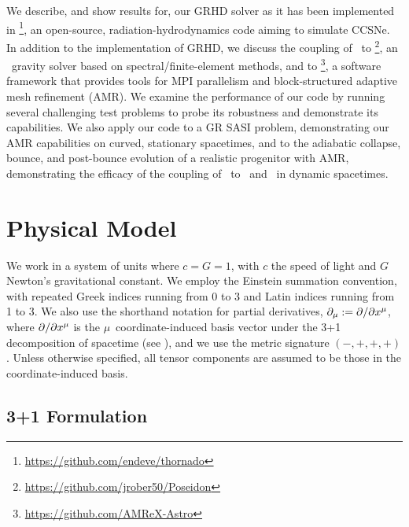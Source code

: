 We describe, and show results for, our GRHD solver
as it has been implemented in \thornado%
\footnote{\url{https://github.com/endeve/thornado}},
an open-source, radiation-hydrodynamics code aiming to simulate CCSNe.
In addition to the implementation of GRHD, we discuss the coupling
of \thornado\ to \poseidon%
\footnote{\url{https://github.com/jrober50/Poseidon}},
an \xcfc\ gravity solver based on spectral/finite-element methods,
and to \amrex\footnote{\url{https://github.com/AMReX-Astro}},
a software framework that provides tools for MPI parallelism
and block-structured adaptive mesh refinement (AMR).
We examine the performance of our code by running several challenging test
problems to probe its robustness and demonstrate its capabilities.
We also apply our code to a GR SASI problem, demonstrating
our AMR capabilities on curved, stationary spacetimes,
and to the adiabatic collapse, bounce, and post-bounce evolution of a realistic
progenitor with AMR,
demonstrating the efficacy of the coupling of
\thornado\ to \poseidon\ and \amrex\ in dynamic spacetimes.

\section{Physical Model}

We work in a system of units where $c=G=1$,
with $c$ the speed of light and $G$ Newton's gravitational constant.
We employ the Einstein summation convention,
with repeated Greek indices running from
0 to 3 and Latin indices running from 1 to 3.
We also use the shorthand notation for partial derivatives,
$\partial_{\mu}:=\partial/\partial x^{\mu}$, where $\partial/\partial x^{\mu}$
is the $\mu$\myth\ coordinate-induced basis vector under the 3+1 decomposition
of spacetime (see ),
and we use the metric signature $\left(-,+,+,+\right)$.
Unless otherwise specified, all tensor components are assumed to be those
in the coordinate-induced basis.

\subsection{3+1 Formulation}
\label{ss.3+1}

